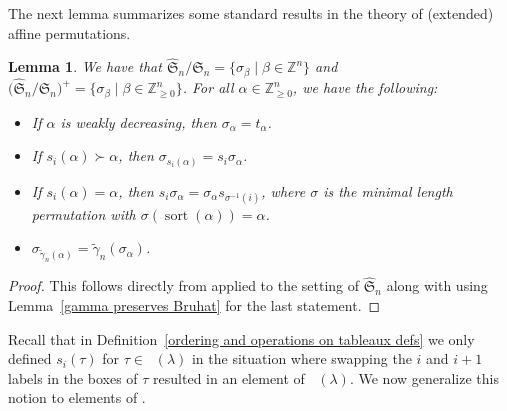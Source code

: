 \documentclass[10pt,a4paper]{amsart}
\numberwithin{equation}{section}
\newtheorem{Lemma}[Theorem]{Lemma}
\theoremstyle{definition}
\DeclareMathOperator{\PSYT}{\mathrm{PSYT}_{\geq 0}}
\DeclareMathOperator{\sort}{sort}
\begin{document}
The next lemma summarizes some standard results in the theory of (extended) affine permutations.

\begin{Lemma}\label{min coset reps Lemma}\label{properties of min length rep}
 We have that
$
 \widehat{\mathfrak{S}}_n/\mathfrak{S}_n= \{ \sigma_{\beta} \mid \beta \in \mathbb{Z}^n \}
$
 and
$
 \bigl(\widehat{\mathfrak{S}}_n/\mathfrak{S}_n \bigr)^{+}= \{ \sigma_{\beta} \mid \beta \in \mathbb{Z}^n_{\geq 0} \}$.
 For all $\alpha \in \mathbb{Z}^{n}_{\geq 0}$, we have the following:
 \begin{itemize}\itemsep=0pt
 \item If $\alpha$ is weakly decreasing, then $\sigma_{\alpha} = t_{\alpha}$.
 \item If $s_i(\alpha) \succ \alpha$, then $\sigma_{s_i(\alpha)}= s_i\sigma_{\alpha}$.
 \item If $s_i(\alpha) = \alpha$, then $s_i\sigma_{\alpha} = \sigma_{\alpha} s_{\sigma^{-1}(i)}$, where $\sigma$ is the minimal length permutation with $\sigma(\sort(\alpha))= \alpha$.
 \item $\sigma_{\widetilde{\gamma}_n(\alpha)} = \widetilde{\gamma}_n (\sigma_{\alpha})$.
 \end{itemize}
\end{Lemma}
\begin{proof}
 This follows directly from \cite[Proposition~2.1]{Stembridge} applied to the setting of $\widehat{\mathfrak{S}}_n$ along with using Lemma~\ref{gamma preserves Bruhat} for the last statement.
\end{proof}

Recall that in Definition~\ref{ordering and operations on tableaux defs} we only defined $s_i(\tau)$ for $\tau \in \PSYT(\lambda)$ in the situation where swapping the $i$ and $i+1$ labels in the boxes of $\tau$ resulted in an element of $\PSYT(\lambda)$. We now generalize this notion to elements of .
\end{document}
